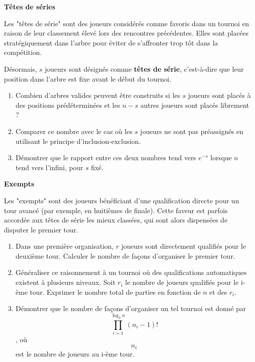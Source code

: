 \documentclass[10pt,a4paper]{article}
\begin{document}
\q \textbf{Têtes de séries}

Les "têtes de série" sont des joueurs considérés comme favoris dans un tournoi en raison de leur
classement élevé lors des rencontres précédentes. Elles sont placées stratégiquement dans l'arbre
pour éviter de s'affronter trop tôt dans la compétition.

Désormais, \( s \) joueurs sont désignés comme \textbf{têtes de série}, c'est-à-dire que leur
position dans l'arbre est fixe avant le début du tournoi.
\begin{enumerate}
    \item Combien d'arbres valides peuvent être construits si les \( s \) joueurs sont placés à des
    positions prédéterminées et les \( n-s \) autres joueurs sont placés librement ?
    \item Comparer ce nombre avec le cas où les \( s \) joueurs ne sont pas préassignés en utilisant
    le principe d'inclusion-exclusion.
    \item Démontrer que le rapport entre ces deux nombres tend vers $ e^{-s} $ lorsque $ n $
    tend vers l'infini, pour $s$ fixé.
\end{enumerate}

\q \textbf{Exempts}

Les "exempts" sont des joueurs bénéficiant d'une qualification directe pour un tour avancé (par
exemple, en huitièmes de finale). Cette faveur est parfois accordée aux têtes de série les mieux
classées, qui sont alors dispensées de disputer le premier tour.

\begin{enumerate}
    \item Dans une première organisation, $r$ joueurs sont directement qualifiés pour le deuxième
    tour. Calculer le nombre de façons d'organiser le premier tour.
    \item Généraliser ce raisonnement à un tournoi où des qualifications automatiques existent à
    plusieurs niveaux. Soit $ r_i $ le nombre de joueurs qualifiés pour le i-ème tour. Exprimer le
    nombre total de parties en fonction de $ n $ et des $ r_i $.
    \item Démontrer que le nombre de façons d'organiser un tel tournoi est donné par
    $$\prod_{i=1}^{\log_2 n} (n_i-1)! $$, où $$ n_i $$ est le nombre de joueurs au i-ème tour.
\end{enumerate}
\end{document}
